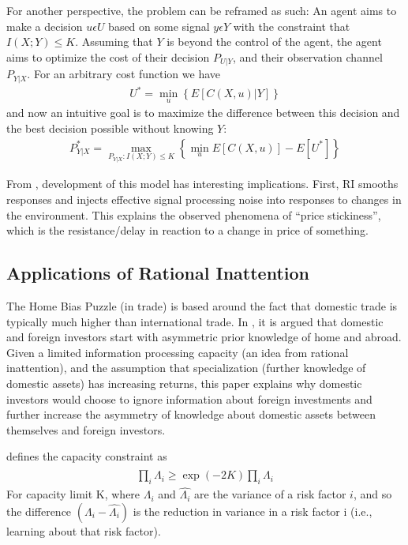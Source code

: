 \documentclass[10pt, twocolumn]{IEEEtran}
\begin{document}
For another perspective, the problem can be reframed as such:
An agent aims to make a decision $u \epsilon U$ based on some signal $y \epsilon Y$ with the constraint that
$I(X;Y) \le K$. Assuming that $Y$ is beyond the control of the agent, the agent aims to optimize the cost of
their decision $P_{U|Y}$, and their observation channel $P_{Y|X}$. For an arbitrary cost function we have
\begin{gather*}
  U^{*} = \min_{u}\left\{E\left[C(X, u)|Y\right]\right\}
\end{gather*}
and now an intuitive goal is to maximize the difference between this decision and the best decision possible
without knowing $Y$:
\begin{gather*}
  P_{Y|X}^{*} = \max_{P_{Y|X} : I(X;Y) \le K}\left\{\min_{u}E\left[C(X, u)\right] - E\left[U^{*}\right]\right\}
\end{gather*}

From \cite{Sims2010}, development of this model has interesting implications. First, RI smooths responses
and injects effective signal processing noise into responses to changes in the environment. This explains
the observed phenomena of ``price stickiness'', which is the resistance/delay in reaction to a change in
price of something.

\subsection{Applications of Rational Inattention}
The Home Bias Puzzle (in trade) is based around the fact that domestic trade is typically much higher than
international trade. In \cite{homeBias}, it is argued that domestic and foreign investors start with asymmetric prior knowledge of
home and abroad. Given a limited information processing capacity (an idea from rational inattention), and the assumption that specialization
(further knowledge of domestic assets) has increasing returns, this paper explains why domestic investors would choose to ignore information about foreign
investments and further increase the asymmetry of knowledge about domestic assets between themselves and foreign investors.

\cite{homeBias} defines the capacity constraint as
\begin{gather*}
  \prod_{i} \widehat{\Lambda_{i}} \ge \exp(-2K) \prod_{i} \Lambda_{i}
\end{gather*}
For capacity limit K, where $\Lambda_{i}$ and $\widehat{\Lambda_{i}}$ are the variance of a risk factor $i$, and so the difference
$(\Lambda_{i} - \widehat{\Lambda_{i}})$ is the reduction in variance in a risk factor i (i.e., learning about that risk factor).
\end{document}

